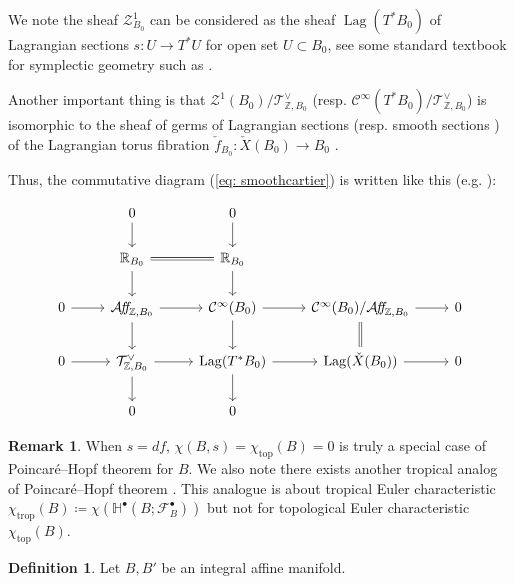\documentclass[a4paper,dvipdfmx,reqno,12pt]{amsart}
\theoremstyle{definition}
\newtheorem{Def}[Thm]{Definition}
\newtheorem{Rmk}[Thm]{Remark}
\newcommand{\deq}{\coloneqq}
\newcommand{\Z}{\mathbb{Z}}%
\newcommand{\mb}[1]{\mathbb{#1}}%
\newcommand{\mcal}[1]{\mathcal{#1}}%
\newcommand{\opn}[1]{\operatorname{#1}}
\newcommand{\AffS}{{\mathop{\mcal{A}\!f\!\!f\!}\nolimits}}
\numberwithin{equation}{section}
\begin{document}
We note the sheaf $\mcal{Z}^{1}_{B_0}$ can be considered as the sheaf 
$\opn{Lag}(T^{*}B_0)$ of Lagrangian sections 
$s:U \to T^{*}U$ for open set $U \subset B_0$, 
see some standard textbook for symplectic geometry 
such as \cite[3.2]{MR1853077}.

Another important thing is that 
$\mcal{Z}^{1}(B_0)/\mcal{T}_{\Z,B_0}^{\vee}$
 (resp. $\mcal{C}^{\infty}(T^{*}B_0)/\mcal{T}_{\Z,B_0}^{\vee}$) 
is isomorphic to the sheaf of germs of Lagrangian sections 
(resp. smooth sections ) of the Lagrangian torus fibration 
$\check{f}_{B_0}\colon \check{X}(B_0)\to B_0$ 
\cite[(2.7), (2.11)]{duistermaatGlobalActionangleCoordinates1980a}.


Thus, the commutative diagram (\ref{eq: smoothcartier}) is written like this 
(e.g. \cite[p.468]{aspinwallDirichletBranesMirror2009}):

\begin{equation} \label{eq:affinecartier}
  \begin{tikzcd}
    & 0 \arrow[d]    & 0 \arrow[d]           &                      &   \\
    & \mb{R}_{B_0} \arrow[r,equal] \arrow[d]                & \mb{R}_{B_0} \arrow[d]           &                      &   \\
    0 \arrow[r] & \AffS_{\Z,B_0} \arrow[r] \arrow[d]         & \mcal{C}^{\infty}(B_0) \arrow[r] \arrow[d] & \mcal{C}^{\infty}(B_0)/\AffS_{\Z,B_0}  \arrow[r] \arrow[d,equal] & 0 \\
    0 \arrow[r] & \mcal{T}_{\Z,B_0}^{\vee} \arrow[r] \arrow[d] & \opn{Lag}(T^{*}B_0) \arrow[r] \arrow[d]  & \opn{Lag}(\check{X}(B_0)) \arrow[r]   & 0 \\
    & 0 & 0 &  &
  \end{tikzcd}
\end{equation}


\begin{Rmk}
When $s=df$, $\chi(B,s)=\chi_{\opn{top}}(B)=0$ is 
truly a special case of Poincar\'e--Hopf theorem for $B$.
We also note there exists another tropical analog of Poincar\'e--Hopf theorem
  \cite{rau2020tropical}. This analogue is about tropical Euler characteristic
$\chi_{\opn{trop}}(B)\deq \chi(\mb{H}^{\bullet}(B;\mcal{F}_B^{\bullet}))$
  but not for topological Euler characteristic $\chi_{\opn{top}}(B)$.
\end{Rmk}

\begin{Def}
Let $B,B'$ be an integral affine manifold.
\end{Def}
\end{document}
